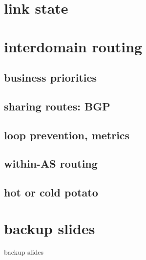 \section{link state}

\section{interdomain routing}

\subsection{business priorities}

\subsection{sharing routes: BGP}

\subsection{loop prevention, metrics}

\subsection{within-AS routing}

\subsection{hot or cold potato}

\section{backup slides}
\begin{frame}{backup slides}
\end{frame}


